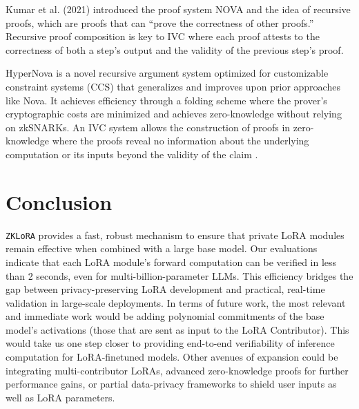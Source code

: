 \documentclass[11pt]{article}
\begin{document}
Kumar et al. (2021) \cite{kothapalli2022nova} introduced the proof system NOVA and the idea of recursive proofs, which are proofs that can ``prove the correctness of other proofs.'' Recursive proof composition is key to IVC where each proof attests to the correctness of both a step’s output and the validity of the previous step’s proof.

HyperNova \cite{kothapalli2024hypernova} is a novel recursive argument system optimized for customizable constraint systems (CCS) that generalizes and improves upon prior approaches like Nova. It achieves efficiency through a folding scheme where the prover’s cryptographic costs are minimized and achieves zero-knowledge without relying on zkSNARKs. An IVC system allows the construction of proofs in zero-knowledge where the proofs reveal no information about the underlying computation or its inputs beyond the validity of the claim \cite{valiant2008incrementally}.

\section{Conclusion}

\texttt{ZKLoRA} provides a fast, robust mechanism to ensure that private LoRA modules remain effective when combined with a large base model. Our evaluations indicate that each LoRA module’s forward computation can be verified in less than 2 seconds, even for multi-billion-parameter LLMs. This efficiency bridges the gap between privacy-preserving LoRA development and practical, real-time validation in large-scale deployments. In terms of future work, the most relevant and immediate work would be adding polynomial commitments of the base model's activations (those that are sent as input to the LoRA Contributor). This would take us one step closer to providing end-to-end verifiability of inference computation for LoRA-finetuned models.  Other avenues of expansion could be integrating multi-contributor LoRAs, advanced zero-knowledge proofs for further performance gains, or partial data-privacy frameworks to shield user inputs as well as LoRA parameters. 



\end{document}
